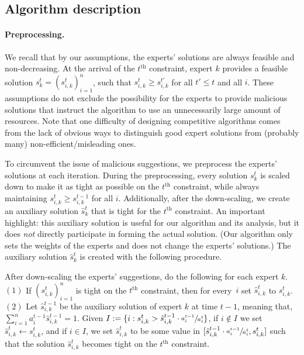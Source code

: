 \subsection{Algorithm description} \label{sec:algo}

\paragraph{Preprocessing.}
We recall that by our assumptions, the experts' solutions are always feasible and non-decreasing. At the arrival of the $t^{\text{th}}$ constraint, expert $k$ provides a feasible solution $s_{k}^{t} = (s_{i,k}^{t})_{i=1}^{n}$, such that $s_{i,k}^{t} \ge s_{i,k}^{t'}$ for all $t' \le t$ and all $i$. These assumptions do not exclude the possibility for the experts to provide malicious solutions that instruct the algorithm to use an unnecessarily large amount of resources.
Note that one difficulty of designing competitive algorithms comes from the lack of obvious ways to distinguish
good expert solutions from (probably many) non-efficient/misleading ones.


To circumvent the issue of malicious suggestions, we preprocess the experts' solutions at each iteration. During the preprocessing, every solution $s_k^t$ is scaled down to make it as tight as possible on the $t^{\text{th}}$ constraint, while always maintaining $s_{i,k}^{t} \geq s_{i,k}^{t-1}$ for all $i$. Additionally, after the down-scaling, we create an auxiliary solution $\hat{s}_k^t$ that is tight for the $t^{\text{th}}$ constraint. An important highlight: this auxiliary solution is useful for our algorithm and its analysis, but it does \emph{not} directly participate in forming the actual solution. (Our algorithm only sets the weights of the experts and does not change the experts' solutions.) The auxiliary solution $\hat{s}_k^t$ is created with the following procedure.

After down-scaling the experts' suggestions, do the following for each expert $k$. $(1)$ If $(s_{i,k}^{t})_{i=1}^{n}$ is tight on the $t^{\text{th}}$ constraint, then for every~$i$ set $\hat{s}_{i,k}^{t}$ to $s_{i,k}^{t}$. $(2)$ Let $\hat{s}_{i,k}^{t-1}$ be the auxiliary solution of expert $k$ at time $t-1$, meaning that, $\sum_{i=1}^{n} a_{i}^{t-1} \hat{s}_{i,k}^{t-1} = 1$. Given $I := \{i: s_{i,k}^{t} > \hat{s}_{i,k}^{t-1} \cdot \sfrac{a_{i}^{t-1}}{a_{i}^{t}} \}$, if $i \notin I$ we set $\hat{s}_{i,k}^{t} \gets s_{i,k}^{t}$, and if $i \in I$, we set $\hat{s}_{i,k}^{t}$ to be some value in $[\hat{s}_{i,k}^{t-1} \cdot \sfrac{a_{i}^{t-1}}{a_{i}^{t}}, s_{i,k}^{t}]$ such that the solution $\hat{s}_{i,k}^{t}$ becomes tight on the $t^{\text{th}}$ constraint.

